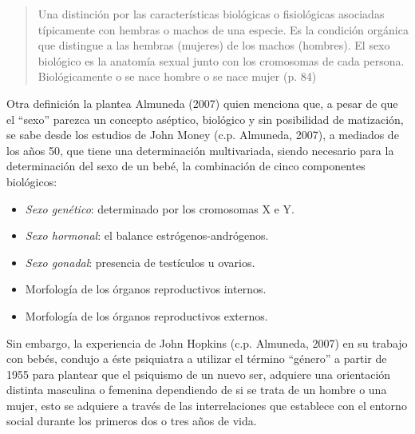 \begin{quote}
    Una distinción por las características biológicas o fisiológicas asociadas
    típicamente con hembras o machos de una especie.
    Es la condición orgánica que distingue a las hembras (mujeres) de los machos
    (hombres).
    El sexo biológico es la anatomía sexual junto con los cromosomas de cada
    persona.
    Biológicamente o se nace hombre o se nace mujer (p. 84)
\end{quote}

Otra definición la plantea Almuneda (2007) quien menciona que, a pesar de que el
“sexo” parezca un concepto aséptico, biológico y sin posibilidad de matización,
se sabe desde los estudios de John Money (c.p. Almuneda, 2007), a mediados
de los años 50, que tiene una determinación multivariada, siendo necesario para
la determinación del sexo de un bebé, la combinación de cinco componentes
biológicos:

\begin{itemize}
    \item \emph{Sexo genético}: determinado por los cromosomas X e Y.
    \item \emph{Sexo hormonal}: el balance estrógenos-andrógenos.
    \item \emph{Sexo gonadal}: presencia de testículos u ovarios.
    \item Morfología de los órganos reproductivos internos.
    \item Morfología de los órganos reproductivos externos.
\end{itemize}

Sin embargo, la experiencia de John Hopkins (c.p. Almuneda, 2007) en su trabajo
con bebés, condujo a éste psiquiatra a utilizar el término “género” a partir de
1955 para plantear que el psiquismo de un nuevo ser, adquiere una orientación
distinta masculina o femenina dependiendo de si se trata de un hombre o una
mujer, esto se adquiere a través de las interrelaciones que establece con el
entorno social durante los primeros dos o tres años de vida.

